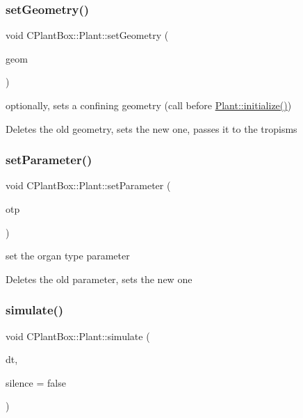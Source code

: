 \subsubsection{\texorpdfstring{set\+Geometry()}{setGeometry()}}
{\footnotesize\ttfamily void C\+Plant\+Box\+::\+Plant\+::set\+Geometry (\begin{DoxyParamCaption}\item[{\hyperlink{classCPlantBox_1_1SignedDistanceFunction}{Signed\+Distance\+Function} $\ast$}]{geom }\end{DoxyParamCaption})}



optionally, sets a confining geometry (call before \hyperlink{classCPlantBox_1_1Plant_a4ef8bb05bda53551c0c32d8c72db1f0c}{Plant\+::initialize()}) 

Deletes the old geometry, sets the new one, passes it to the tropisms \mbox{\label{classCPlantBox_1_1Plant_a19971905d39798d9809ce87f0b51e48d}} 
\subsubsection{\texorpdfstring{set\+Parameter()}{setParameter()}}
{\footnotesize\ttfamily void C\+Plant\+Box\+::\+Plant\+::set\+Parameter (\begin{DoxyParamCaption}\item[{\hyperlink{classCPlantBox_1_1SeedRandomOrganParameter}{Seed\+Random\+Organ\+Parameter} $\ast$}]{otp }\end{DoxyParamCaption})}



set the organ type parameter 

Deletes the old parameter, sets the new one \mbox{\label{classCPlantBox_1_1Plant_a47d8afff8e281a1760fa4b8046cc4378}} 
\subsubsection{\texorpdfstring{simulate()}{simulate()}\hspace{0.1cm}{\footnotesize\ttfamily [1/2]}}
{\footnotesize\ttfamily void C\+Plant\+Box\+::\+Plant\+::simulate (\begin{DoxyParamCaption}\item[{double}]{dt,  }\item[{bool}]{silence = {\ttfamily false} }\end{DoxyParamCaption})}



